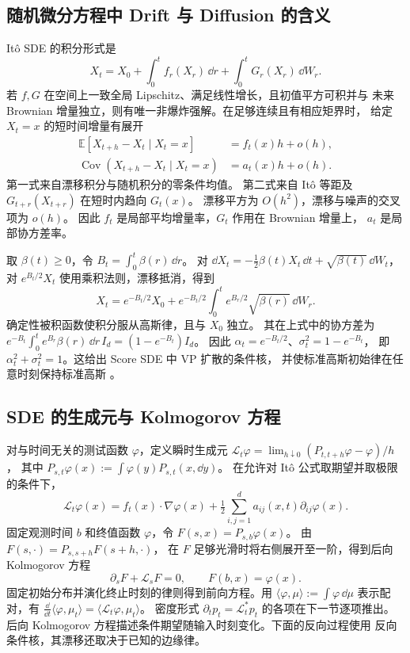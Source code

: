 \subsection{随机微分方程中 Drift 与 Diffusion 的含义}

Itô SDE 的积分形式是
\[
  X_t=X_0+\int_0^t f_r(X_r)\,\dd r+\int_0^t G_r(X_r)\,\dd W_r .
\]
若 \(f,G\) 在空间上一致全局 Lipschitz、满足线性增长，且初值平方可积并与
未来 Brownian 增量独立，则有唯一非爆炸强解。在足够连续且有相应矩界时，
给定 \(X_t=x\) 的短时间增量有展开
\begin{align*}
  \mathbb E[X_{t+h}-X_t\mid X_t=x] &= f_t(x)h+o(h),\\
  \operatorname{Cov}(X_{t+h}-X_t\mid X_t=x) &= a_t(x)h+o(h).
\end{align*}
第一式来自漂移积分与随机积分的零条件均值。
第二式来自 Itô 等距及 \(G_{t+r}(X_{t+r})\) 在短时内趋向 \(G_t(x)\)。
漂移平方为 \(O(h^2)\)，漂移与噪声的交叉项为 \(o(h)\)。
因此 \(f_t\) 是局部平均增量率，\(G_t\) 作用在 Brownian 增量上，
\(a_t\) 是局部协方差率。

\begin{example}[方差保持扩散的条件分布]
取 \(\beta(t)\ge0\)，令 \(B_t=\int_0^t\beta(r)\,\dd r\)。
对 \(\dd X_t=-\frac12\beta(t)X_t\,\dd t+\sqrt{\beta(t)}\,\dd W_t\)，
对 \(e^{B_t/2}X_t\) 使用乘积法则，漂移抵消，得到
\[
  X_t=e^{-B_t/2}X_0+
       e^{-B_t/2}\int_0^t e^{B_r/2}\sqrt{\beta(r)}\,\dd W_r .
\]
确定性被积函数使积分服从高斯律，且与 \(X_0\) 独立。
其在上式中的协方差为
\(e^{-B_t}\int_0^t e^{B_r}\beta(r)\,\dd r\,I_d=(1-e^{-B_t})I_d\)。
因此 \(\alpha_t=e^{-B_t/2}\)、\(\sigma_t^2=1-e^{-B_t}\)，
即 \(\alpha_t^2+\sigma_t^2=1\)。这给出 Score SDE 中 VP 扩散的条件核，
并使标准高斯初始律在任意时刻保持标准高斯 \cite{song2021sde}。
\end{example}

\subsection{SDE 的生成元与 Kolmogorov 方程}

对与时间无关的测试函数 \(\varphi\)，定义瞬时生成元
\(\mathcal L_t\varphi=\lim_{h\downarrow0}(P_{t,t+h}\varphi-\varphi)/h\)，
其中 \(P_{s,t}\varphi(x):=\int\varphi(y)P_{s,t}(x,\dd y)\)。
在允许对 Itô 公式取期望并取极限的条件下，
\begin{equation}
  \mathcal L_t\varphi(x)
    =f_t(x)\cdot\nabla\varphi(x)
       +\tfrac12\sum_{i,j=1}^d a_{ij}(x,t)\partial_{ij}\varphi(x).
  \label{eq:foundations-generator}
\end{equation}
固定观测时间 \(b\) 和终值函数 \(\varphi\)，令 \(F(s,x)=P_{s,b}\varphi(x)\)。
由 \(F(s,\cdot)=P_{s,s+h}F(s+h,\cdot)\)，
在 \(F\) 足够光滑时将右侧展开至一阶，得到后向 Kolmogorov 方程
\[
  \partial_s F+\mathcal L_s F=0,\qquad F(b,x)=\varphi(x).
\]
固定初始分布并演化终止时刻的律则得到前向方程。用
\(\langle\varphi,\mu\rangle:=\int\varphi\,\dd\mu\) 表示配对，有
\(\frac{\dd}{\dd t}\langle\varphi,\mu_t\rangle
=\langle\mathcal L_t\varphi,\mu_t\rangle\)。
密度形式 \(\partial_t p_t=\mathcal L_t^*p_t\) 的各项在下一节逐项推出。
后向 Kolmogorov 方程描述条件期望随输入时刻变化。下面的反向过程使用
反向条件核，其漂移还取决于已知的边缘律。

